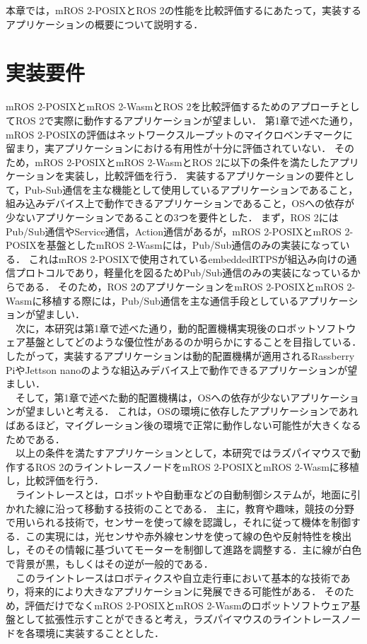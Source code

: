 \noindent 本章では，mROS 2-POSIXとROS 2の性能を比較評価するにあたって，実装するアプリケーションの概要について説明する．
\section{実装要件}
mROS 2-POSIXとmROS 2-WasmとROS 2を比較評価するためのアプローチとしてROS 2で実際に動作するアプリケーションが望ましい．
第1章で述べた通り，mROS 2-POSIXの評価はネットワークスループットのマイクロベンチマークに留まり，実アプリケーションにおける有用性が十分に評価されていない．
そのため，mROS 2-POSIXとmROS 2-WasmとROS 2に以下の条件を満たしたアプリケーションを実装し，比較評価を行う．
実装するアプリケーションの要件として，Pub-Sub通信を主な機能として使用しているアプリケーションであること，組み込みデバイス上で動作できるアプリケーションであること，OSへの依存が少ないアプリケーションであることの3つを要件とした．
まず，ROS 2にはPub/Sub通信やService通信，Action通信があるが，mROS 2-POSIXとmROS 2-POSIXを基盤としたmROS 2-Wasmには，Pub/Sub通信のみの実装になっている．
これはmROS 2-POSIXで使用されているembeddedRTPSが組込み向けの通信プロトコルであり，軽量化を図るためPub/Sub通信のみの実装になっているからである．
そのため，ROS 2のアプリケーションをmROS 2-POSIXとmROS 2-Wasmに移植する際には，Pub/Sub通信を主な通信手段としているアプリケーションが望ましい．
\\　次に，本研究は第1章で述べた通り，動的配置機構実現後のロボットソフトウェア基盤としてどのような優位性があるのか明らかにすることを目指している．
したがって，実装するアプリケーションは動的配置機構が適用されるRassberry PiやJettson nanoのような組込みデバイス上で動作できるアプリケーションが望ましい．
\\　そして，第1章で述べた動的配置機構は，OSへの依存が少ないアプリケーションが望ましいと考える．
これは，OSの環境に依存したアプリケーションであればあるほど，マイグレーション後の環境で正常に動作しない可能性が大きくなるためである．
\\　以上の条件を満たすアプリケーションとして，本研究ではラズパイマウスで動作するROS 2のライントレースノードをmROS 2-POSIXとmROS 2-Wasmに移植し，比較評価を行う．
\\　ライントレースとは，ロボットや自動車などの自動制御システムが，地面に引かれた線に沿って移動する技術のことである．
主に，教育や趣味，競技の分野で用いられる技術で，センサーを使って線を認識し，それに従って機体を制御する．この実現には，光センサや赤外線センサを使って線の色や反射特性を検出し，そのその情報に基づいてモーターを制御して進路を調整する．主に線が白色で背景が黒，もしくはその逆が一般的である．
\\　このライントレースはロボティクスや自立走行車において基本的な技術であり，将来的により大きなアプリケーションに発展できる可能性がある．
そのため，評価だけでなくmROS 2-POSIXとmROS 2-Wasmのロボットソフトウェア基盤として拡張性示すことができると考え，ラズパイマウスのライントレースノードを各環境に実装することとした．
